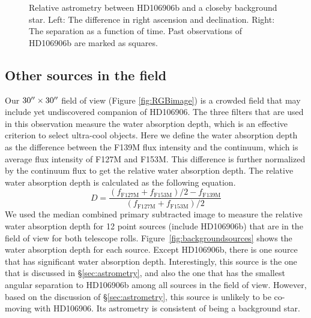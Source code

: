 \documentclass[modern]{aastex62}
\begin{document}
\begin{figure}
  \centering
  \caption{Relative astrometry between HD106906b and a closeby background star. Left: The difference in right ascension and declination. Right: The separation as a function of time. Past observations of HD106906b are marked as squares.}
  \label{fig:astrometry:bck}
\end{figure}

\subsection{Other sources in the field}
Our $30\mbox{$^{\prime\prime}$}\times30\mbox{$^{\prime\prime}$}$ field of view (Figure \ref{fig:RGBimage}) is a crowded field that may include yet undiscovered companion of HD106906. The three filters that are used in this observation measure the water absorption depth, which is an effective criterion to select ultra-cool objects. Here we define the water absorption depth as the difference between the F139M flux intensity and the continuum, which is average flux intensity of F127M and F153M. This difference is further normalized by the continuum flux to get the relative water absorption depth. The relative water absorption depth is calculated as the following equation.
\begin{equation}
D = \frac{(f_{\mathrm{F127M}} + f_\mathrm{F153M})/2 - f_{\mathrm{F139M}}}{(f_{\mathrm{F127M}} + f_\mathrm{{F153M}})/2}
\end{equation}
We used the median combined primary subtracted image to measure the relative water absorption depth for 12 point sources (include HD106906b) that are in the field of view for both telescope rolls. Figure~\ref{fig:backgroundsources} shows the water absorption depth for each source. Except HD106906b, there is one source that has significant water absorption depth. Interestingly, this source is the one that is discussed in \S\ref{sec:astrometry}, and also the one that has the smallest angular separation to HD106906b among all sources in the field of view. However, based on the discussion of \S\ref{sec:astrometry}, this source is unlikely to be co-moving with HD106906. Its astrometry is consistent of being a background star.
\end{document}
